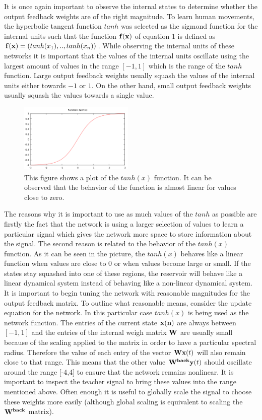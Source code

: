 \documentclass[letterpaper,9pt]{article}
\begin{document}
It is once again important to observe the internal states to determine whether the output feedback weights are of the right magnitude. To learn human movements, the hyperbolic tangent function $tanh$ was selected as the sigmond function for the internal units such that the function ${\bf f(x)}$ of equation 1 is defined as ${\bf f(x)} = (tanh(x_1),..,tanh(x_n))$. While observing the internal units of these networks it is important that the values of the internal units oscillate using the largest amount of values in the range $[-1,1]$ which is the range of the $tanh$ function. Large output feedback weights usually squash the values of the internal units either towards $-1$ or $1$. On the other hand, small output feedback weights usually squash the values towards a single value.

\begin{figure}[h!]
  \centering
  \includegraphics[height=125px]{Extra/tanh.png}
    \caption[Plot of $tanh(x)$ Function]{This figure shows a plot of the $tanh(x)$ function. It can be observed that the behavior of the function is almost linear for values close to zero.}
\end{figure}


The reasons why it is important to use as much values of the $tanh$ as possible are firstly the fact that the network is using a larger selection of values to learn a particular signal which gives the network more space to store information about the signal. The second reason is related to the behavior of the $tanh(x)$ function. As it can be seen in the picture, the $tanh(x)$ behaves like a linear function when values are close to 0 or when values become large or small. If the states stay squashed into one of these regions, the reservoir will behave like a linear dynamical system instead of behaving like a non-linear dynamical system.\\

It is important to begin tuning the network with reasonable magnitudes for the output feedback matrix. To outline what reasonable means, consider the update equation for the network. In this particular case $tanh(x)$ is being used as the network function. The entries of the current state ${\bf x(n)}$ are always between $[-1,1]$ and the entries of the internal weigh matrix ${\bf W}$ are usually small because of the scaling applied to the matrix in order to have a particular spectral radius. Therefore the value of each entry of the vector ${\bf Wx}(t)$ will also remain close to that range. This means that the other value ${\bf W^{back}y}(t)$ should oscillate around the range [-4,4] to ensure that the network remains nonlinear. It is important to inspect the teacher signal to bring these values into the range mentioned above. Often enough it is useful to globally scale the signal to choose these weights more easily (although global scaling is equivalent to scaling the ${\bf W^{back}}$ matrix).
\end{document}
